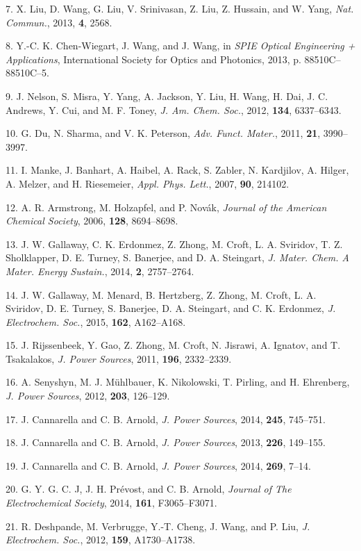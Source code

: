 \documentclass[]{article}
\begin{document}
7.{ }X. Liu, D. Wang, G. Liu, V. Srinivasan, Z. Liu, Z. Hussain, and W.
Yang, \emph{Nat. Commun.}, 2013, \textbf{4}, 2568.

8.{ }Y.-C. K. Chen-Wiegart, J. Wang, and J. Wang, in \emph{SPIE Optical
Engineering + Applications}, International Society for Optics and
Photonics, 2013, p. 88510C--88510C--5.

9.{ }J. Nelson, S. Misra, Y. Yang, A. Jackson, Y. Liu, H. Wang, H. Dai,
J. C. Andrews, Y. Cui, and M. F. Toney, \emph{J. Am. Chem. Soc.}, 2012,
\textbf{134}, 6337--6343.

10.{ }G. Du, N. Sharma, and V. K. Peterson, \emph{Adv. Funct. Mater.},
2011, \textbf{21}, 3990--3997.

11.{ }I. Manke, J. Banhart, A. Haibel, A. Rack, S. Zabler, N. Kardjilov,
A. Hilger, A. Melzer, and H. Riesemeier, \emph{Appl. Phys. Lett.}, 2007,
\textbf{90}, 214102.

12.{ }A. R. Armstrong, M. Holzapfel, and P. Novák, \emph{Journal of the
American Chemical Society}, 2006, \textbf{128}, 8694--8698.

13.{ }J. W. Gallaway, C. K. Erdonmez, Z. Zhong, M. Croft, L. A.
Sviridov, T. Z. Sholklapper, D. E. Turney, S. Banerjee, and D. A.
Steingart, \emph{J. Mater. Chem. A Mater. Energy Sustain.}, 2014,
\textbf{2}, 2757--2764.

14.{ }J. W. Gallaway, M. Menard, B. Hertzberg, Z. Zhong, M. Croft, L. A.
Sviridov, D. E. Turney, S. Banerjee, D. A. Steingart, and C. K.
Erdonmez, \emph{J. Electrochem. Soc.}, 2015, \textbf{162}, A162--A168.

15.{ }J. Rijssenbeek, Y. Gao, Z. Zhong, M. Croft, N. Jisrawi, A.
Ignatov, and T. Tsakalakos, \emph{J. Power Sources}, 2011, \textbf{196},
2332--2339.

16.{ }A. Senyshyn, M. J. Mühlbauer, K. Nikolowski, T. Pirling, and H.
Ehrenberg, \emph{J. Power Sources}, 2012, \textbf{203}, 126--129.

17.{ }J. Cannarella and C. B. Arnold, \emph{J. Power Sources}, 2014,
\textbf{245}, 745--751.

18.{ }J. Cannarella and C. B. Arnold, \emph{J. Power Sources}, 2013,
\textbf{226}, 149--155.

19.{ }J. Cannarella and C. B. Arnold, \emph{J. Power Sources}, 2014,
\textbf{269}, 7--14.

20.{ }G. Y. G. C. J, J. H. Prévost, and C. B. Arnold, \emph{Journal of
The Electrochemical Society}, 2014, \textbf{161}, F3065--F3071.

21.{ }R. Deshpande, M. Verbrugge, Y.-T. Cheng, J. Wang, and P. Liu,
\emph{J. Electrochem. Soc.}, 2012, \textbf{159}, A1730--A1738.
\end{document}
